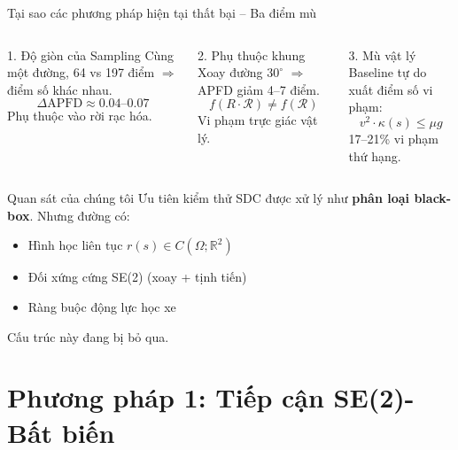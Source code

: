\documentclass[aspectratio=169,10pt]{beamer}
\begin{document}
\begin{frame}{Tại sao các phương pháp hiện tại thất bại -- Ba điểm mù}
\begin{columns}[T]
\begin{alertblock}{1. Độ giòn của Sampling}
\small
Cùng một đường, 64 vs 197 điểm $\Rightarrow$ điểm số khác nhau.
\[
\Delta\text{APFD} \approx 0.04\text{--}0.07
\]
Phụ thuộc vào rời rạc hóa.
\end{alertblock}

\begin{alertblock}{2. Phụ thuộc khung}
\small
Xoay đường $30^\circ$ $\Rightarrow$ APFD giảm 4--7 điểm.
\[
f(R \cdot \mathcal{R}) \neq f(\mathcal{R})
\]
Vi phạm trực giác vật lý.
\end{alertblock}

\begin{alertblock}{3. Mù vật lý}
\small
Baseline tự do xuất điểm số vi phạm:
\[
v^2 \cdot \kappa(s) \le \mu g
\]
17--21\% vi phạm thứ hạng.
\end{alertblock}
\end{columns}

\vspace{1.2em}
\begin{block}{Quan sát của chúng tôi}
Ưu tiên kiểm thử SDC được xử lý như \textbf{phân loại black-box}. Nhưng đường có:
\begin{itemize}
  \item Hình học liên tục $r(s) \in C(\Omega; \mathbb{R}^2)$
  \item Đối xứng cứng SE(2) (xoay + tịnh tiến)
  \item Ràng buộc động lực học xe
\end{itemize}
\alert{Cấu trúc này đang bị bỏ qua.}
\end{block}
\end{frame}

\section{Phương pháp 1: Tiếp cận SE(2)-Bất biến}
\end{document}
